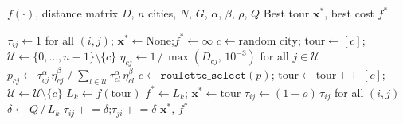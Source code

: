 \begin{algorithm}[H]
\caption{ACO --- Discrete solver (TSP)}
\label{alg:aco-discrete}
\begin{algorithmic}[1]
\REQUIRE $f(\cdot)$, distance matrix $D$, $n$ cities, $N$, $G$, $\alpha$, $\beta$, $\rho$, $Q$
\ENSURE Best tour $\mathbf{x}^*$, best cost $f^*$

\STATE $\tau_{ij} \leftarrow 1$ for all $(i,j)$;\quad
       $\mathbf{x}^* \leftarrow \text{None}$;\quad $f^* \leftarrow \infty$
   
    \STATE $c \leftarrow \text{random city}$;\quad
           $\text{tour} \leftarrow [c]$;\quad
           $\mathcal{U} \leftarrow \{0,\ldots,n-1\}\setminus\{c\}$
      \STATE $\eta_{cj} \leftarrow 1\,/\,\max(D_{cj},\,10^{-3})$ for all $j\in\mathcal{U}$
      \STATE $p_{cj} \leftarrow \tau_{cj}^\alpha\,\eta_{cj}^\beta\;/\;
             \sum_{l\in\mathcal{U}}\tau_{cl}^\alpha\,\eta_{cl}^\beta$
      \STATE $c \leftarrow \texttt{roulette\_select}(p)$;\quad
             $\text{tour} \leftarrow \text{tour}\,{+\!\!+}\,[c]$;\quad
             $\mathcal{U} \leftarrow \mathcal{U}\setminus\{c\}$
    \ENDWHILE
    \STATE $L_k \leftarrow f(\text{tour})$
     \STATE $f^*\leftarrow L_k$;\; $\mathbf{x}^*\leftarrow\text{tour}$
    \ENDIF
  \ENDFOR
  \STATE $\tau_{ij} \leftarrow (1-\rho)\,\tau_{ij}$ for all $(i,j)$ 
    \STATE $\delta \leftarrow Q\,/\,L_k$
      \STATE $\tau_{ij} \mathrel{+}= \delta$;\quad $\tau_{ji} \mathrel{+}= \delta$
    \ENDFOR
  \ENDFOR
\ENDFOR
\RETURN $\mathbf{x}^*$, $f^*$
\end{algorithmic}
\end{algorithm}

